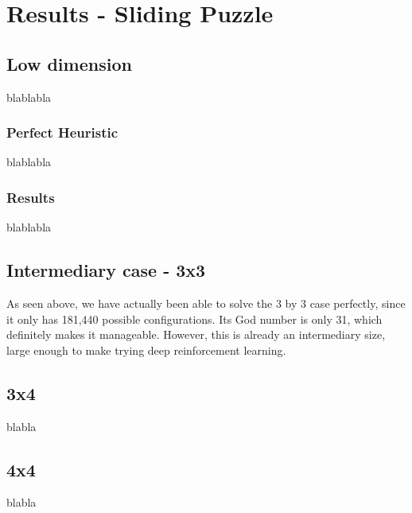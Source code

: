 
\chapter{Results - Sliding Puzzle} %

\label{Chapter4} %


\section{Low dimension}

blablabla

\subsection{Perfect Heuristic}

blablabla


\subsection{Results}

blablabla

\section{Intermediary case - 3x3}
\label{S33}
As seen above, we have actually been able to solve the 3 by 3 case perfectly, since it only has 181,440 possible configurations. Its God number is only 31, which definitely makes it manageable. However, this is already an intermediary size, large enough to make trying deep reinforcement learning.


\section{3x4}

blabla


\section{4x4}

blabla
